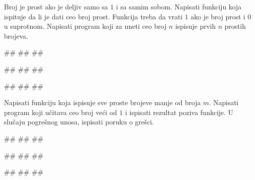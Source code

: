 \begin{Exercise}[label=v1.4_08] 
Broj je prost ako je deljiv samo sa $1$ i sa samim sobom. Napisati
funkciju  koja ispituje da li je dati ceo
broj prost. Funkcija treba da vrati $1$ ako je broj prost i $0$ u
suprotnom. Napisati program koji za uneti ceo broj
$n$ ispisuje prvih $n$ prostih brojeva.

\begin{miditest}
\begin{upotreba}{1}
#\naslovInt#
##
##
\end{upotreba}
\end{miditest}
\begin{miditest}
\begin{upotreba}{2}
#\naslovInt#
##
##
\end{upotreba}
\end{miditest}

\begin{miditest}
\begin{upotreba}{3}
#\naslovInt#
##
##
\end{upotreba}
\end{miditest}

\end{Exercise}
\ifresenja 
\begin{Answer}[ref=v1.4_08]
\end{Answer} 
\fi

\begin{Exercise}[label=p1.4_] 
Napisati funkciju  koja ispisuje
sve proste brojeve manje od broja $m$.  Napisati program koji učitava
ceo broj veći od $1$ i ispisati rezultat poziva funkcije. U slučaju
pogrešnog unosa, ispisati poruku o grešci. %
 
\begin{miditest}
\begin{upotreba}{1}
#\naslovInt#
##
##
\end{upotreba}
\end{miditest}
\begin{miditest}
\begin{upotreba}{2}
#\naslovInt#
##
##
\end{upotreba}
\end{miditest}

\begin{miditest}
\begin{upotreba}{3}
#\naslovInt#
##
##
\end{upotreba}
\end{miditest}

\end{Exercise}



